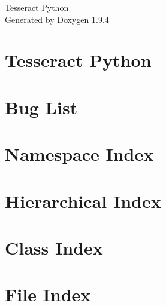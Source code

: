 \documentclass[twoside]{book}
\newcommand{\+}{\discretionary{\mbox{\scriptsize$\hookleftarrow$}}{}{}}
\newcommand{\clearemptydoublepage}{%
    \newpage{\pagestyle{empty}\cleardoublepage}%
  }
\begin{document}
  \raggedbottom
    \hypersetup{pageanchor=false,
                bookmarksnumbered=true,
                pdfencoding=unicode
               }
  \begin{titlepage}
  \vspace*{7cm}
  \begin{center}%
  {\Large Tesseract Python}\\
  \vspace*{1cm}
  {\large Generated by Doxygen 1.9.4}\\
  \end{center}
  \end{titlepage}
  \clearemptydoublepage
  \tableofcontents
  \clearemptydoublepage
  \hypersetup{pageanchor=true}
\chapter{Tesseract Python}
\label{index}\hypertarget{index}{}
\chapter{Bug List}
\label{bug}

\chapter{Namespace Index}

\chapter{Hierarchical Index}

\chapter{Class Index}

\chapter{File Index}

\end{document}
